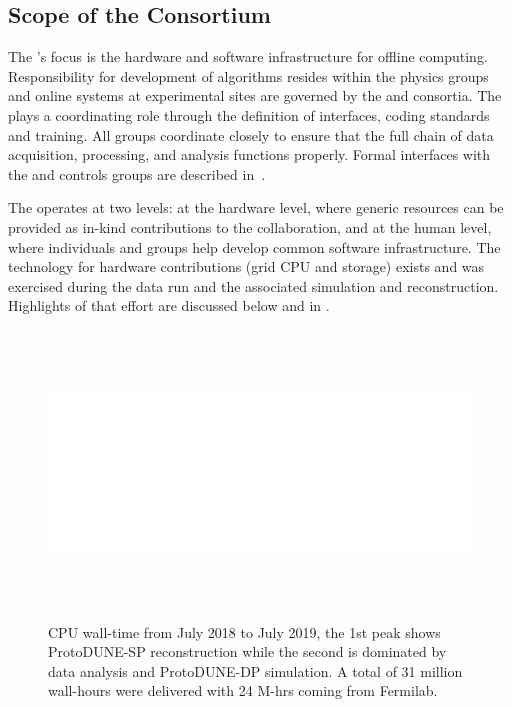 \subsection{Scope of the Consortium}
The 's focus is the hardware and software infrastructure  for offline computing.  Responsibility for development of algorithms  resides within the physics groups %
and online systems at experimental sites are governed by the  and  consortia. The  plays a coordinating role through the definition of interfaces, coding standards and training. All groups coordinate closely to ensure that the full chain of data acquisition, processing, and analysis %
functions properly. Formal interfaces with the  and controls groups are described in~\cite{bib:docdb7123,bib:docdb7126}. %

The  operates at two levels: at the hardware level, where generic resources can be provided as in-kind contributions to the collaboration, and at the human level, where individuals and groups help develop common software infrastructure.  The   technology for hardware contributions (grid CPU and storage) exists and was exercised during the  data run and the associated %
simulation and reconstruction. Highlights of that effort are discussed below and in \physchtools{}. %



\begin{figure}[htp]
\centering
\includegraphics[height=3in]{graphics/comp-ComputingLastYear.png}
\caption[CPU wall-time from July 2018 to July 2019]{CPU wall-time from July 2018 to July 2019, the 1st peak shows  ProtoDUNE-SP reconstruction while the second is dominated by data analysis and ProtoDUNE-DP simulation. A total of 31 million wall-hours were delivered with 24 M-hrs coming from Fermilab.  }
\label{fig:ch-exec-comp-cpupie}
\end{figure}


